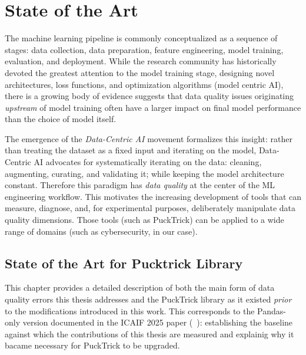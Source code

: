 \documentclass[../main.tex]{subfiles}
\begin{document}
\chapter{State of the Art}
\label{chap:related}

The machine learning pipeline is commonly conceptualized as a sequence of stages: data collection, data preparation, feature engineering, model training, evaluation, and deployment. While the research community has historically devoted the greatest attention to the model training stage, designing novel architectures, loss functions, and optimization algorithms (model centric AI), there is a growing body of evidence suggests that data quality issues originating \emph{upstream} of model training often have a larger impact on final model performance than the choice of model itself.

The emergence of the \emph{Data-Centric AI} movement formalizes this insight: rather than
treating the dataset as a fixed input and iterating on the model, Data-Centric
AI advocates for systematically iterating on the data: cleaning, augmenting,
curating, and validating it; while keeping the model architecture constant.
Therefore this paradigm has \emph{data quality} at the center of the ML engineering workflow. This motivates the increasing development of tools that can measure, diagnose, and, for experimental purposes, deliberately manipulate data quality dimensions. 
Those tools (such as PuckTrick) can be applied to a wide range of domains 
(such as cybersecurity, in our case). 


\newpage
\section{State of the Art for Pucktrick Library}

This chapter provides a detailed description of both the main form of data quality errors this thesis addresses and the PuckTrick library as it existed \emph{prior} to the modifications introduced in this work.
This corresponds to the Pandas-only version documented in the ICAIF 2025 paper (~\supercite{icaif2025pucktrick}): establishing the baseline against which the contributions of this thesis are measured and explainig why it bacame necessary for PuckTrick to be upgraded.
\end{document}
